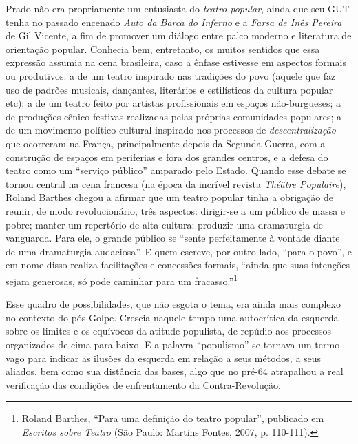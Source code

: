 Prado não era propriamente um entusiasta do \textit{teatro popular}, ainda
que seu GUT tenha no passado encenado \textit{Auto da Barca do Inferno} e a
\textit{Farsa de Inês Pereira} de Gil Vicente, a fim de promover um diálogo
entre palco moderno e literatura de orientação popular. Conhecia bem,
entretanto, os muitos sentidos que essa expressão assumia na cena
brasileira, caso a ênfase estivesse em aspectos formais ou produtivos: a
de um teatro inspirado nas tradições do povo (aquele que faz uso de
padrões musicais, dançantes, literários e estilísticos da cultura
popular etc); a de um teatro feito por artistas profissionais em espaços
não-burgueses; a de produções cênico-festivas realizadas pelas próprias
comunidades populares; a de um movimento político-cultural inspirado nos
processos de \textit{descentralização} que ocorreram na França,
principalmente depois da Segunda Guerra, com a construção de espaços em
periferias e fora dos grandes centros, e a defesa do teatro como um
“serviço público” amparado pelo Estado. Quando esse debate se tornou
central na cena francesa (na época da incrível revista \textit{Théâtre
Populaire}), Roland Barthes chegou a afirmar que um teatro popular tinha
a obrigação de reunir, de modo revolucionário, três aspectos: dirigir-se
a um público de massa e pobre; manter um repertório de alta cultura;
produzir uma dramaturgia de vanguarda. Para ele, o grande público se
“sente perfeitamente à vontade diante de uma dramaturgia audaciosa”. E
quem escreve, por outro lado, “para o povo”, e em nome disso realiza
facilitações e concessões formais, “ainda que suas intenções sejam
generosas, só pode caminhar para um fracasso.”\footnote{Roland Barthes,
  “Para uma definição do teatro popular”, publicado em \textit{Escritos
  sobre Teatro} (São Paulo: Martins Fontes, 2007, p. 110-111).}

Esse quadro de possibilidades, que não esgota o tema, era ainda mais
complexo no contexto do pós-Golpe. Crescia naquele tempo uma autocrítica
da esquerda sobre os limites e os equívocos da atitude populista, de
repúdio aos processos organizados de cima para baixo. E a palavra
“populismo” se tornava um termo vago para indicar as ilusões da esquerda
em relação a seus métodos, a seus aliados, bem como sua distância das
bases, algo que no pré-64 atrapalhou a real verificação das condições de
enfrentamento da Contra-Revolução.

